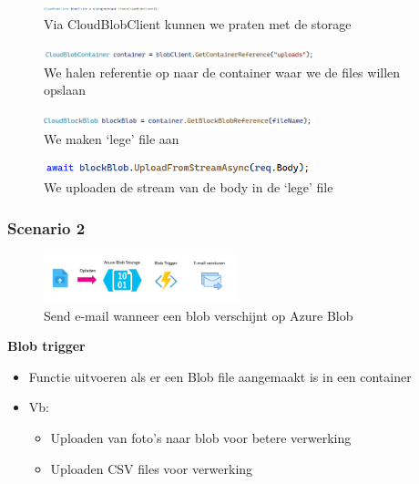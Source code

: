 \documentclass{article}
\newcommand{\bold}[1]{\textbf{#1}}
\begin{document}
\begin{figure}[H]
    \centering
    \includegraphics[width=0.3\textwidth]{scenario-1-6.png}
    \caption{Via CloudBlobClient kunnen we praten met de storage}
\end{figure}

\begin{figure}[H]
    \centering
    \includegraphics[width=0.7\textwidth]{scenario-1-7.png}
    \caption{We halen referentie op naar de container waar we de files willen opslaan}
\end{figure}

\begin{figure}[H]
    \centering
    \includegraphics[width=0.7\textwidth]{scenario-1-8.png}
    \caption{We maken `lege' file aan}
\end{figure}

\begin{figure}[H]
    \centering
    \includegraphics[width=0.7\textwidth]{scenario-1-9.png}
    \caption{We uploaden de stream van de body in de `lege' file}
\end{figure}

\subsubsection{Scenario 2}

\begin{figure}[H]
    \centering
    \includegraphics[width=0.5\textwidth]{azure-storage-scenario-2.png}
    \caption{Send e-mail wanneer een blob verschijnt op Azure Blob}
\end{figure}

\bold{Blob trigger}

\begin{itemize}
    \item Functie uitvoeren als er een Blob file aangemaakt is in een container
    \item Vb:
    \begin{itemize}
        \item Uploaden van foto's naar blob voor betere verwerking
        \item Uploaden CSV files voor verwerking
    \end{itemize}
\end{itemize}
\end{document}

